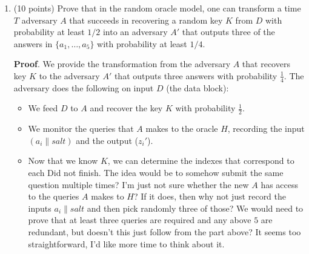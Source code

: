 \documentclass{article}
\begin{document}
\begin{enumerate}
\begin{enumerate}[,label=\alph*.]
\begin{enumerate}[noitemsep,topsep=\mdcompacttopsep,label=\roman*.]
\item{}(10 points) Prove that in the random oracle model, one can transform a time $T$ adversary $A$ that succeeds in recovering a random key $K$ from $D$ with probability at least $1/2$ into an adversary $A'$ that outputs three of the answers in $\{ a_1,\ldots, a_5 \}$ with probability at least $1/4$.

\begin{mdbmarginx}{1ex}{0pt}{1ex}{0pt}%
\noindent{}\textbf{Proof}.  We provide the transformation from the adversary $A$ that recovers key $K$ to the adversary
$A'$ that outputs three answers with probability $\frac{1}{4}$.
The adversary does the following on input $D$ (the data block):%

\begin{itemize}[noitemsep,topsep=\mdcompacttopsep]%

\item{}We feed $D$ to $A$ and recover the key $K$ with probability $\frac{1}{2}$.%

\item{}We monitor the queries that $A$ makes to the oracle $H$, recording the input $(a_i \| salt)$ and the output ($z_i'$).%

\item{}Now that we know $K$, we can determine the indexes that correspond to each 
Did not finish. The idea would be to somehow submit the same question multiple times? I'm
just not sure whether the new $A$ has access to the queries $A$ makes to $H$? If it does,
then why not just record the inputs $a_i \| salt$ and then pick randomly three of those?
We would need to prove that at least three queries are required and any above $5$ are
redundant, but doesn't this just follow from the part above? It seems too straightforward,
I'd like more time to think about it.%
\end{itemize}%
\end{mdbmarginx}%
\end{enumerate}%
\end{enumerate}%
\end{enumerate}%
\end{document}

